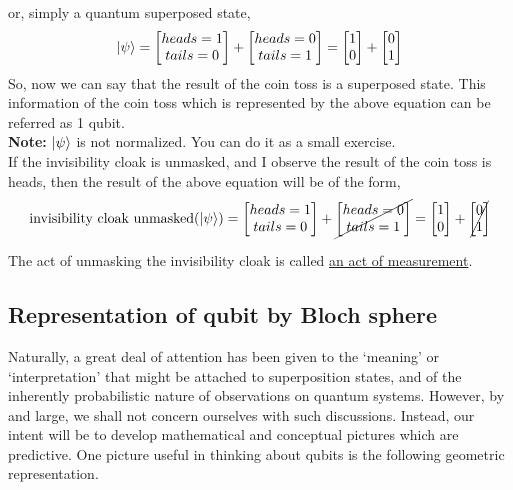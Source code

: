 \documentclass{article}
\begin{document}
or, simply a quantum superposed state,
\begin{equation}
    \ket{\psi} = \begin{bmatrix}
        heads = 1 \\ tails = 0
    \end{bmatrix} + \begin{bmatrix}
        heads =0 \\ tails =1
    \end{bmatrix} = \begin{bmatrix}
        1 \\ 0 
    \end{bmatrix} + \begin{bmatrix}
        0 \\1
    \end{bmatrix}
\end{equation}
So, now we can say that the result of the coin toss is a superposed state. This information of the coin toss which is represented by the above equation can be referred as 1 qubit.\\
\textbf{Note:} $\ket{\psi}$ is not normalized. You can do it as a small exercise.\\
If the invisibility cloak is unmasked, and I observe the result of the coin toss is heads, then the result of the above equation will be of the form,
\begin{equation*}
    \text{invisibility cloak unmasked}(\ket{\psi}) = \begin{bmatrix}
        heads = 1 \\ tails = 0
    \end{bmatrix} + \cancel{\begin{bmatrix}
        heads =0 \\ tails =1
    \end{bmatrix}} = \begin{bmatrix}
        1 \\ 0 
    \end{bmatrix} + \cancel{\begin{bmatrix}
        0 \\1
    \end{bmatrix}}
\end{equation*}

The act of unmasking the invisibility cloak is called \underline{an act of measurement}.

\subsection{Representation of qubit by Bloch
sphere}
\label{Representation of qubit by Bloch
sphere}
Naturally, a great deal of attention has been given to the ‘meaning’ or ‘interpretation’
that might be attached to superposition states, and of the inherently probabilistic nature of
observations on quantum systems. However, by and large, we shall not concern ourselves
with such discussions. Instead, our intent will be to develop mathematical
and conceptual pictures which are predictive. One picture useful in thinking about qubits is the following geometric representation.
\end{document}
